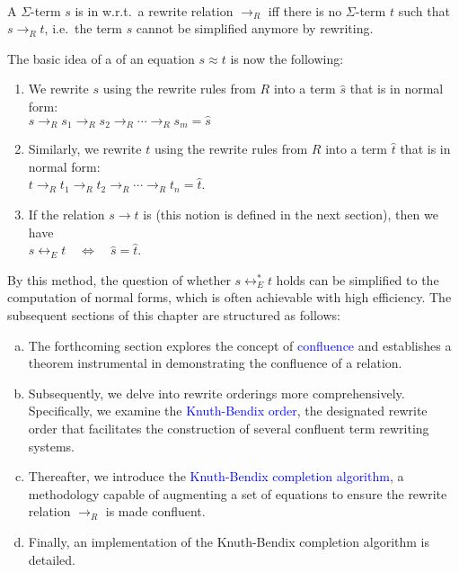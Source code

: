 \begin{Definition} \hspace*{\fill} \\
  A $\Sigma$-term $s$ is in  w.r.t.~a rewrite relation $\rightarrow_R$ iff there is no
  $\Sigma$-term $t$ such that $s \rightarrow_R t$, i.e.~the term $s$ cannot be simplified anymore by rewriting. \eod
\end{Definition}
The basic idea of a  of an equation $s \approx t$ is now the following:
\begin{enumerate}
\item We rewrite $s$ using the rewrite rules from $R$ into a term $\widehat{s}$ that is in normal form:
      \\[0.2cm]
      \hspace*{1.3cm}
      $s \rightarrow_R s_1 \rightarrow_R s_2 \rightarrow_R \cdots \rightarrow_R s_m = \widehat{s}$
\item Similarly, we rewrite $t$ using the rewrite rules from $R$ into a term $\widehat{t}$ that is in normal form:
      \\[0.2cm]
      \hspace*{1.3cm}
      $t \rightarrow_R t_1 \rightarrow_R t_2 \rightarrow_R \cdots \rightarrow_R t_n = \widehat{t}$.
\item If the relation $s \rightarrow t$ is  (this notion is defined in the next section),
      then we have 
      \\[0.2cm]
      \hspace*{1.3cm}
      $s \leftrightarrow_E t \quad \Leftrightarrow \quad \widehat{s} = \widehat{t}$.
    \end{enumerate}
By this method, the question of whether $s \leftrightarrow_E^* t$ holds can be simplified to the computation of
normal forms, which is often achievable with high efficiency. The subsequent sections of this chapter are
structured as follows: 
\begin{enumerate}[(a)]
\item The forthcoming section explores the concept of \textcolor{blue}{confluence} and establishes a theorem
      instrumental in demonstrating the confluence of a relation. 
\item Subsequently, we delve into rewrite orderings more comprehensively. Specifically, we examine the
      \textcolor{blue}{Knuth-Bendix order}, the designated rewrite order that facilitates the construction of
      several confluent term rewriting systems. 
\item Thereafter, we introduce the \textcolor{blue}{Knuth-Bendix completion algorithm}, a methodology capable
      of augmenting a set of equations to ensure the rewrite relation $\rightarrow_R$ is made confluent. 
\item Finally, an implementation of the Knuth-Bendix completion algorithm is detailed.
\end{enumerate}


